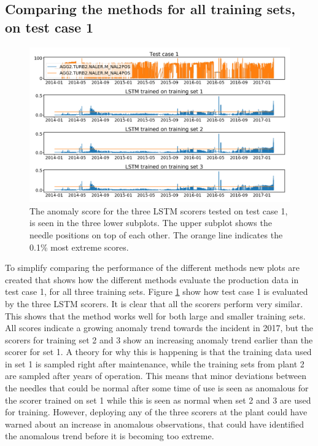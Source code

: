     
    
    \subsection{Comparing the methods for all training sets, on test case 1}
        \begin{figure}[h!]
            \centering
            \includegraphics[width=\textwidth]{report/figures/analysis/training_cases/lstm_training_cases.png}
            \caption{The anomaly score for the three LSTM scorers tested on test case 1, is seen in the three lower subplots. The upper subplot shows the needle positions on top of each other. The orange line indicates the 0.1\% most extreme scores.}
            \label{fig:lstm_training_cases}
        \end{figure}
        To simplify comparing the performance of the different methods new plots are created that shows how the different methods evaluate the production data in test case 1, for all three training sets. Figure \ref{fig:lstm_training_cases} show how test case 1 is evaluated by the three LSTM scorers. It is clear that all the scorers perform very similar. This shows that the method works well for both large and smaller training sets. All scores indicate a growing anomaly trend towards the incident in 2017, but the scorers for training set 2 and 3 show an increasing anomaly trend earlier than the scorer for set 1. A theory for why this is happening is that the training data used in set 1 is sampled right after maintenance, while the training sets from plant 2 are sampled after years of operation. This means that minor deviations between the needles that could be normal after some time of use is seen as anomalous for the scorer trained on set 1 while this is seen as normal when set 2 and 3 are used for training. However, deploying any of the three scorers at the plant could have warned about an increase in anomalous observations, that could have identified the anomalous trend before it is becoming too extreme. 
        
